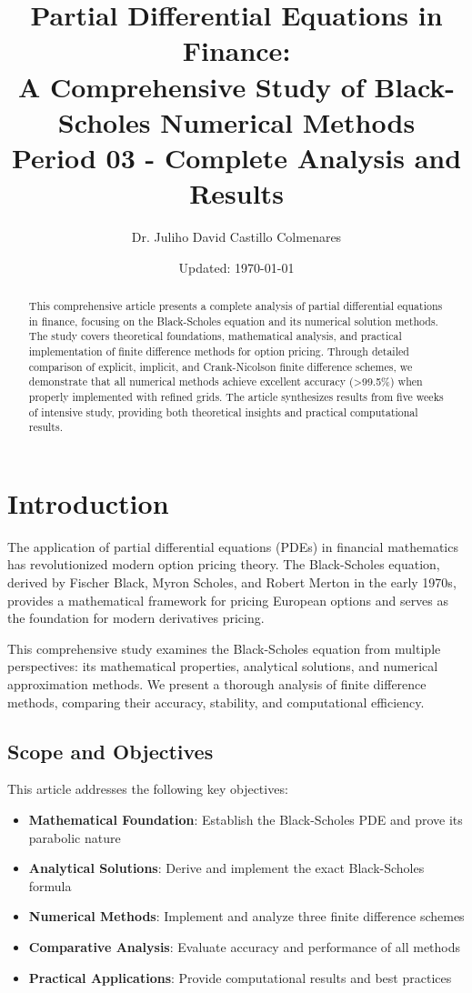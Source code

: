 \documentclass[12pt,a4paper]{article}
\title{\textbf{Partial Differential Equations in Finance: \\
A Comprehensive Study of Black-Scholes Numerical Methods} \\
\large Period 03 - Complete Analysis and Results}
\author{Dr. Juliho David Castillo Colmenares}
\date{Updated: \today}
\numberwithin{algorithm}{subsection}
\begin{document}
\maketitle

\begin{abstract}
This comprehensive article presents a complete analysis of partial differential equations in finance, focusing on the Black-Scholes equation and its numerical solution methods. The study covers theoretical foundations, mathematical analysis, and practical implementation of finite difference methods for option pricing. Through detailed comparison of explicit, implicit, and Crank-Nicolson finite difference schemes, we demonstrate that all numerical methods achieve excellent accuracy (>99.5\%) when properly implemented with refined grids. The article synthesizes results from five weeks of intensive study, providing both theoretical insights and practical computational results.
\end{abstract}

\tableofcontents
\listoffigures
\newpage
\listoftables
\newpage

\section{Introduction}
\label{sec:introduction}

The application of partial differential equations (PDEs) in financial mathematics has revolutionized modern option pricing theory. The Black-Scholes equation, derived by Fischer Black, Myron Scholes, and Robert Merton in the early 1970s, provides a mathematical framework for pricing European options and serves as the foundation for modern derivatives pricing.

This comprehensive study examines the Black-Scholes equation from multiple perspectives: its mathematical properties, analytical solutions, and numerical approximation methods. We present a thorough analysis of finite difference methods, comparing their accuracy, stability, and computational efficiency.

\subsection{Scope and Objectives}

This article addresses the following key objectives:

\begin{itemize}
\item \textbf{Mathematical Foundation}: Establish the Black-Scholes PDE and prove its parabolic nature
\item \textbf{Analytical Solutions}: Derive and implement the exact Black-Scholes formula
\item \textbf{Numerical Methods}: Implement and analyze three finite difference schemes
\item \textbf{Comparative Analysis}: Evaluate accuracy and performance of all methods
\item \textbf{Practical Applications}: Provide computational results and best practices
\end{itemize}
\end{document}
